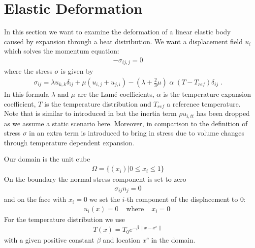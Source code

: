 
%
%
%

\section{Elastic Deformation}
\label{ELASTIC CHAP}
In this section we want to examine the deformation of a linear elastic body caused by expansion through a heat distribution.
We want a displacement field $u_{i}$ which solves the momentum
equation:
\begin{eqnarray}\label{HEATEDBLOCK general problem}
 - \sigma_{ij,j}=0
\end{eqnarray}
where the stress $\sigma$ is given by
\begin{eqnarray}\label{HEATEDBLOCK linear elastic}
 \sigma_{ij}= \lambda u_{k,k} \delta_{ij} + \mu ( u_{i,j} + u_{j,i})
 - (\lambda+\frac{2}{3} \mu)  \; \alpha  \;  (T-T_{ref})\delta_{ij} \;.
\end{eqnarray}
In this formula $\lambda$ and $\mu$ are the Lam\'e coefficients, $\alpha$ is the
temperature expansion coefficient, $T$ is the temperature distribution and $T_{ref}$ a reference temperature.
Note that  is similar to 
introduced in  but the inertia term $\rho u_{i,tt}$
has been dropped as we assume a static scenario here.
Moreover, in comparison to the  definition of stress $\sigma$
in  an extra term is introduced to bring in
stress due to volume changes through temperature dependent expansion.

Our domain is the unit cube
\begin{eqnarray} \label{HEATEDBLOCK natural location}
\Omega=\{(x_{i}) | 0 \le x_{i} \le 1 \}
\end{eqnarray}
On the boundary the normal stress component is set to zero
\begin{eqnarray} \label{HEATEDBLOCK natural}
\sigma_{ij}n_{j}=0
\end{eqnarray}
and on the face with $x_{i}=0$ we set the $i$-th component of the displacement to $0$:
\begin{eqnarray} \label{HEATEDBLOCK constraint}
u_{i}(x)=0 & \mbox{ where } & x_{i}=0 \;
\end{eqnarray}
For the temperature distribution we use
\begin{eqnarray} \label{HEATEDBLOCK temperature}
T(x)= T_{0} e^{-\beta \|x-x^{c}\|}
\end{eqnarray}
with a given positive constant $\beta$ and location $x^{c}$ in the domain.

